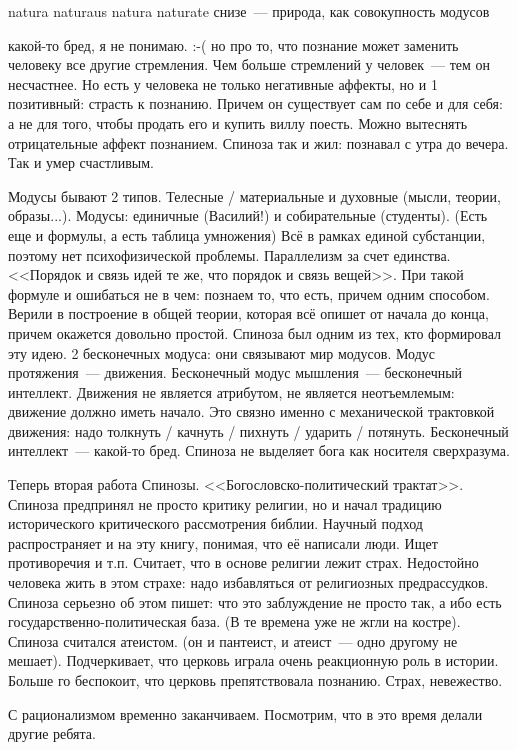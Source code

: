 natura naturaus
natura naturate     снизе~--- природа, как совокупность модусов

какой-то бред, я не понимаю. :-( но про то, что познание может заменить человеку все другие стремления.
Чем больше стремлений у человек~--- тем он несчастнее. Но есть у человека не только негативные аффекты, но и 1 позитивный: страсть к познанию. Причем он существует сам по себе и для себя: а не для того, чтобы продать его и купить виллу поесть. Можно вытеснять отрицательные аффект познанием. Спиноза так и жил: познавал с утра до вечера. Так и умер счастливым.

Модусы бывают 2 типов. Телесные / материальные и духовные (мысли, теории, образы...). Модусы: единичные (Василий!) и собирательные (студенты). (Есть еще и формулы, а есть таблица умножения) 
Всё в рамках единой субстанции, поэтому нет психофизической проблемы. Параллелизм за счет единства. <<Порядок и связь идей те же, что порядок и связь вещей>>. При такой формуле и ошибаться не в чем: познаем то, что есть, причем одним способом. Верили в построение в общей теории, которая всё опишет от начала до конца, причем окажется довольно простой. Спиноза был одним из тех, кто формировал эту идею.
2 бесконечных модуса: они связывают мир модусов. Модус протяжения~--- движения. Бесконечный модус мышления~--- бесконечный интеллект. Движения не является атрибутом, не является неотъемлемым: движение должно иметь начало. Это связно именно с механической трактовкой движения: надо толкнуть / качнуть / пихнуть / ударить / потянуть.
Бесконечный интеллект~--- какой-то бред. Спиноза не выделяет бога как носителя сверхразума.

Теперь вторая работа Спинозы. <<Богословско-политический трактат>>. Спиноза предпринял не просто критику религии, но и начал традицию исторического критического рассмотрения библии. Научный подход распространяет и на эту книгу, понимая, что её написали люди. Ищет противоречия и т.п. Считает, что в основе религии лежит страх. Недостойно человека жить в этом страхе: надо избавляться от религиозных предрассудков. Спиноза серьезно об этом пишет: что это заблуждение не просто так, а ибо есть государственно-политическая база. (В те времена уже не жгли на костре). Спиноза считался атеистом. (он и пантеист, и атеист~--- одно другому не мешает). Подчеркивает, что церковь играла очень реакционную роль в истории. Больше го беспокоит, что церковь препятствовала познанию. Страх, невежество.

С рационализмом временно заканчиваем. Посмотрим, что в это время делали другие ребята.